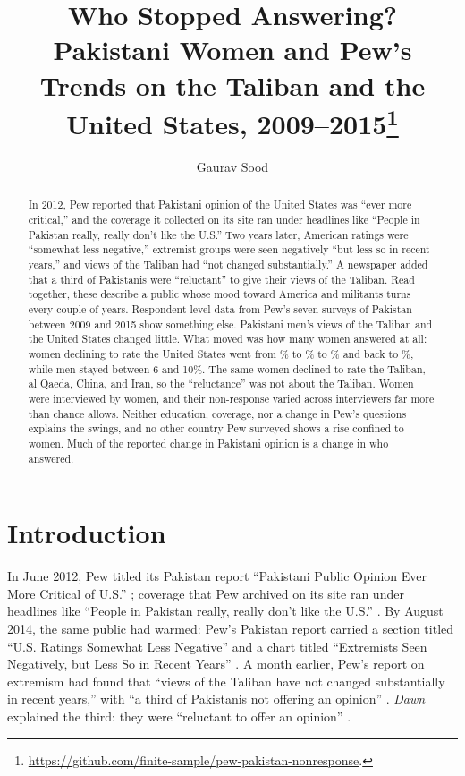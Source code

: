 \documentclass[11pt,letterpaper]{article}
\title{Who Stopped Answering? Pakistani Women and Pew's Trends on the Taliban and the United States, 2009--2015\thanks{\url{https://github.com/finite-sample/pew-pakistan-nonresponse}.}}
\author{Gaurav Sood}
\date{}
\begin{document}
\maketitle

\begin{abstract}
\noindent In 2012, Pew reported that Pakistani opinion of the United States was ``ever more critical,'' and the coverage it collected on its site ran under headlines like ``People in Pakistan really, really don't like the U.S.'' Two years later, American ratings were ``somewhat less negative,'' extremist groups were seen negatively ``but less so in recent years,'' and views of the Taliban had ``not changed substantially.'' A newspaper added that a third of Pakistanis were ``reluctant'' to give their views of the Taliban. Read together, these describe a public whose mood toward America and militants turns every couple of years. Respondent-level data from Pew's seven surveys of Pakistan between 2009 and 2015 show something else. Pakistani men's views of the Taliban and the United States changed little. What moved was how many women answered at all: women declining to rate the United States went from \WomenUSOld{}\% to \WomenUSLow{}\% to \WomenUS{}\% and back to \WomenUSLast{}\%, while men stayed between 6 and 10\%. The same women declined to rate the Taliban, al Qaeda, China, and Iran, so the ``reluctance'' was not about the Taliban. Women were interviewed by women, and their non-response varied across interviewers far more than chance allows. Neither education, coverage, nor a change in Pew's questions explains the swings, and no other country Pew surveyed shows a rise confined to women. Much of the reported change in Pakistani opinion is a change in who answered.
\end{abstract}

\section{Introduction}

In June 2012, Pew titled its Pakistan report ``Pakistani Public Opinion Ever More Critical of U.S.'' \citep{pew2012pakistan}; coverage that Pew archived on its site ran under headlines like ``People in Pakistan really, really don't like the U.S.'' \citep{pew2012dontlike}. By August 2014, the same public had warmed: Pew's Pakistan report carried a section titled ``U.S. Ratings Somewhat Less Negative'' and a chart titled ``Extremists Seen Negatively, but Less So in Recent Years'' \citep{pew2014pakistan}. A month earlier, Pew's report on extremism had found that ``views of the Taliban have not changed substantially in recent years,'' with ``a third of Pakistanis not offering an opinion'' \citep{pew2014extremism}. \textit{Dawn} explained the third: they were ``reluctant to offer an opinion'' \citep{iqbal2014dawn}.
\end{document}
